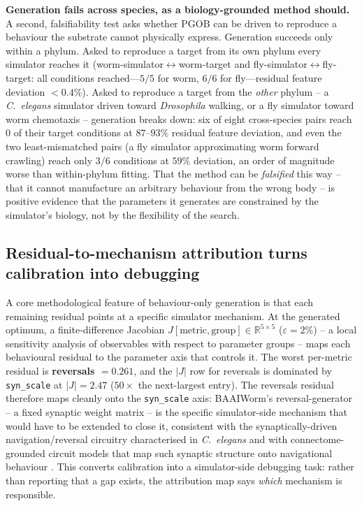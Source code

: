 \documentclass[11pt]{article}
\begin{document}
\textbf{Generation fails across species, as a biology-grounded method should.} A second, falsifiability test asks whether PGOB can be driven to reproduce a behaviour the substrate cannot physically express. Generation succeeds only within a phylum. Asked to reproduce a target from its own phylum every simulator reaches it (worm-simulator$\leftrightarrow$worm-target and fly-simulator$\leftrightarrow$fly-target: all conditions reached---$5/5$ for worm, $6/6$ for fly---residual feature deviation $<0.4\%$). Asked to reproduce a target from the \emph{other} phylum -- a \emph{C.\ elegans} simulator driven toward \emph{Drosophila} walking, or a fly simulator toward worm chemotaxis -- generation breaks down: six of eight cross-species pairs reach $0$ of their target conditions at $87$--$93\%$ residual feature deviation, and even the two least-mismatched pairs (a fly simulator approximating worm forward crawling) reach only $3/6$ conditions at $59\%$ deviation, an order of magnitude worse than within-phylum fitting. That the method can be \emph{falsified} this way -- that it cannot manufacture an arbitrary behaviour from the wrong body -- is positive evidence that the parameters it generates are constrained by the simulator's biology, not by the flexibility of the search.

\subsection{Residual-to-mechanism attribution turns calibration into debugging}
\label{sec:m4}

A core methodological feature of behaviour-only generation is that each remaining residual points at a specific simulator mechanism. At the generated optimum, a finite-difference Jacobian $J[\text{metric},\text{group}]\in\mathbb{R}^{5\times 5}$ ($\varepsilon{=}2\%$) -- a local sensitivity analysis of observables with respect to parameter groups \citep{saltelli2008global} -- maps each behavioural residual to the parameter axis that controls it. The worst per-metric residual is \textbf{reversals $=0.261$}, and the $|J|$ row for reversals is dominated by \texttt{syn\_scale} at $|J|{=}2.47$ ($50\times$ the next-largest entry). The reversals residual therefore maps cleanly onto the \texttt{syn\_scale} axis: BAAIWorm's reversal-generator -- a fixed synaptic weight matrix -- is the specific simulator-side mechanism that would have to be extended to close it, consistent with the synaptically-driven navigation/reversal circuitry characterised in \emph{C.\ elegans} \citep{gray2005circuit} and with connectome-grounded circuit models that map such synaptic structure onto navigational behaviour \citep{chen2022neural,karbowski2019deciphering}. This converts calibration into a simulator-side debugging task: rather than reporting that a gap exists, the attribution map says \emph{which} mechanism is responsible.
\end{document}

